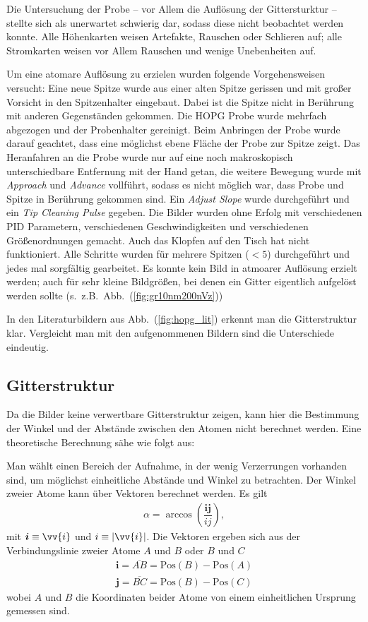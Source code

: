 \documentclass[sn-mathphys-num,iicol]{sn-jnl}
\theoremstyle{thmstyleone}
\theoremstyle{thmstyletwo}
\theoremstyle{thmstylethree}
\begin{document}
Die Untersuchung der Probe -- vor Allem die Auflösung der Gittersturktur -- stellte sich als unerwartet schwierig dar, sodass diese nicht beobachtet werden konnte.
Alle Höhenkarten weisen Artefakte, Rauschen oder Schlieren auf; alle Stromkarten weisen vor Allem Rauschen und wenige Unebenheiten auf.

Um eine atomare Auflösung zu erzielen wurden folgende Vorgehensweisen versucht:
Eine neue Spitze wurde aus einer alten Spitze gerissen und mit großer Vorsicht in den Spitzenhalter eingebaut.
Dabei ist die Spitze nicht in Berührung mit anderen Gegenständen gekommen.
Die HOPG Probe wurde mehrfach abgezogen und der Probenhalter gereinigt.
Beim Anbringen der Probe wurde darauf geachtet, dass eine möglichst ebene Fläche der Probe zur Spitze zeigt.
Das Heranfahren an die Probe wurde nur auf eine noch makroskopisch unterschiedbare Entfernung mit der Hand getan, die weitere Bewegung wurde mit \textit{Approach} und \textit{Advance} vollführt, sodass es nicht möglich war, dass Probe und Spitze in Berührung gekommen sind.
Ein \textit{Adjust Slope} wurde durchgeführt und ein \textit{Tip Cleaning Pulse} gegeben.
Die Bilder wurden ohne Erfolg mit verschiedenen PID Parametern, verschiedenen Geschwindigkeiten und verschiedenen Größenordnungen gemacht.
Auch das Klopfen auf den Tisch hat nicht funktioniert.
Alle Schritte wurden für mehrere Spitzen ($<5$) durchgeführt und jedes mal sorgfältig gearbeitet.
Es konnte kein Bild in atmoarer Auflösung erzielt werden; auch für sehr kleine Bildgrößen, bei denen ein Gitter eigentlich aufgelöst werden sollte (s.\ z.B.\ Abb.\ (\ref{fig:gr10nm200nVz}))

In den Literaturbildern aus Abb.\ (\ref{fig:hopg_lit}) erkennt man die Gitterstruktur klar.
Vergleicht man mit den aufgenommenen Bildern sind die Unterschiede eindeutig.

\subsection{Gitterstruktur}
Da die Bilder keine verwertbare Gitterstruktur zeigen, kann hier die Bestimmung der Winkel und der Abstände zwischen den Atomen nicht berechnet werden.
Eine theoretische Berechnung sähe wie folgt aus:

Man wählt einen Bereich der Aufnahme, in der wenig Verzerrungen vorhanden sind, um möglichst einheitliche Abstände und Winkel zu betrachten.
Der Winkel zweier Atome kann über Vektoren berechnet werden.
Es gilt
\begin{align} 
  \alpha =\arccos\left(\dfrac{\boldsymbol{i} \boldsymbol{j} }{ij}\right)
,\end{align} 
mit $\boldsymbol{i} \equiv\vv{i}$ und $i\equiv |\vv{i}|$.
Die Vektoren ergeben sich aus der Verbindungslinie zweier Atome $A$ und $B$ oder $B$ und $C$
\begin{align} 
  \boldsymbol{i} =\overline{AB}=\text{Pos}(B)-\text{Pos}(A)\\
  \boldsymbol{j} =\overline{BC}=\text{Pos}(B)-\text{Pos}(C)
\end{align} 
wobei $A$ und $B$ die Koordinaten beider Atome von einem einheitlichen Ursprung gemessen sind.
\end{document}
